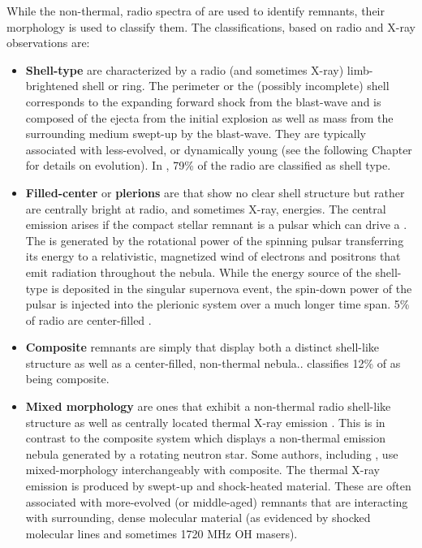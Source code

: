 While the non-thermal, radio \sync{} spectra of  \snrs{} are used to identify remnants, their morphology is used to classify them. The classifications, based on radio and X-ray observations are:
\begin{itemize}
	\item \textbf{ Shell-type} \snrs{} are characterized by a radio (and sometimes X-ray) limb-brightened shell or ring. The perimeter or the (possibly incomplete) shell corresponds to the expanding forward shock from the blast-wave and is composed of the ejecta from the initial explosion as well as mass from the surrounding medium swept-up by the blast-wave. They are typically associated with less-evolved, or dynamically young \snrs{} (see the following Chapter for details on \snr{} evolution). In \cite{Green14}, 79\% of the radio \snrs{} are classified as shell type. 
	
	\item \textbf{Filled-center} \snrs{} or \textbf{plerions} are \snrs{} that show no clear shell structure but  rather are centrally bright at radio, and sometimes X-ray, energies. The central \sync{} emission arises if the  compact stellar remnant is a pulsar which can drive a \pwn{} \cite{Gaensler06}. The \pwn{} is generated by the rotational power of the spinning pulsar transferring its energy to a relativistic, magnetized wind of electrons and positrons that emit \sync{} radiation throughout the nebula. While the energy source of the shell-type \snr{} is deposited in the singular supernova event, the spin-down power of the pulsar is injected into the plerionic system over a much longer time span. 5\% of radio \snrs{} are center-filled \citep{Green14}.
	\item \textbf{Composite} remnants are simply \snrs{} that display both a  distinct shell-like structure as well as a center-filled, non-thermal \sync{} nebula.. \cite{Green14} classifies 12\% of \snrs{} as being composite.
	
	\item \textbf{Mixed morphology} \snrs{} are ones that exhibit a non-thermal radio shell-like structure as well as centrally located thermal X-ray emission \citep{Rho98}. This is in contrast to the composite system which displays a non-thermal emission nebula generated by a rotating neutron star. Some authors, including \cite{Green14}, use mixed-morphology interchangeably with composite. The thermal X-ray emission is produced by swept-up and shock-heated  material. These \snrs{} are often associated with more-evolved (or middle-aged) remnants that are interacting with surrounding, dense molecular material (as evidenced by shocked molecular lines and sometimes 1720 MHz OH masers). 
\end{itemize}

